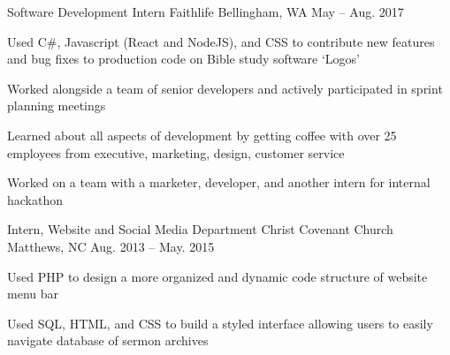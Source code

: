 

\begin{cventries}

  \cventry
    {Software Development Intern} %
    {Faithlife} %
    {Bellingham, WA} %
    {May – Aug. 2017} %
    {
      \begin{cvitems} %
        \item {Used C\#, Javascript (React and NodeJS), and CSS to contribute new features and bug fixes to production code on Bible study software `Logos'}
        \item {Worked alongside a team of senior developers and actively participated in sprint planning meetings}
        \item {Learned about all aspects of development by getting coffee with over 25 employees from executive, marketing, design, customer service}
        \item {Worked on a team with a marketer, developer, and another intern for internal hackathon}
      \end{cvitems}
    }

  \cventry
    {Intern, Website and Social Media Department} %
    {Christ Covenant Church} %
    {Matthews, NC} %
    {Aug. 2013 – May. 2015} %
    {
      \begin{cvitems} %
        \item {Used PHP to design a more organized and dynamic code structure of website menu bar}
        \item {Used SQL, HTML, and CSS to build a styled interface allowing users to easily navigate database of sermon archives}
      \end{cvitems}
    }

\end{cventries}
